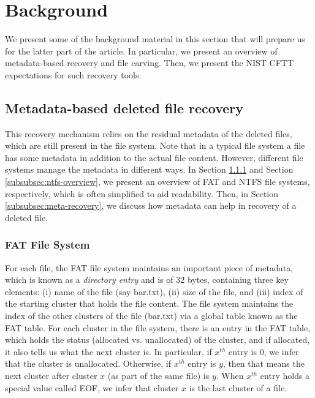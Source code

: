 \section{Background}

We present some of the background material in this section that will prepare
us for the latter part of the article. 
In particular, we present an overview of metadata-based recovery and file carving. 
Then, we present the NIST CFTT expectations for such recovery tools.  


\subsection{Metadata-based deleted file recovery}
This recovery mechanism relies on the residual metadata of the deleted files, 
which are still present in the file system. Note that in a typical file system 
a file has some metadata in addition to the actual file content. However,
different file systems
manage the metadata in different ways.
In Section \ref{subsubsec:fat-overview} and Section \ref{subsubsec:ntfs-overview}, 
we present an overview of FAT and NTFS file systems, respectively, which is often
simplified to aid readability. 
Then, in Section \ref{subsubsec:meta-recovery}, we discuss how metadata can help in 
recovery of a deleted file.

\subsubsection{FAT File System} \label{subsubsec:fat-overview}

For each file, the FAT file system maintains an important piece of metadata, 
which is known as a \emph{directory entry} and is of 32 bytes, containing three 
key elements: (i) name of the file (say bar.txt), (ii) size of the file, and 
(iii) index of the starting cluster that holds the file content. 
The file system maintains the index of the other clusters of the file (bar.txt) 
via a global table known as the FAT table. For each cluster in the file system, 
there is an entry in the FAT table, which holds the status 
(allocated vs. unallocated) of the cluster, and if allocated, 
it also tells us what the next cluster is. In particular, if $x^{th}$ entry is $0$, 
we infer that the cluster is unallocated. Otherwise, if $x^{th}$ entry is $y$, then 
that means the next cluster after cluster $x$ (as part of the same file) is $y$.
When $x^{th}$ entry holds a special value called EOF, we infer that cluster $x$ is
the last cluster of a file.

